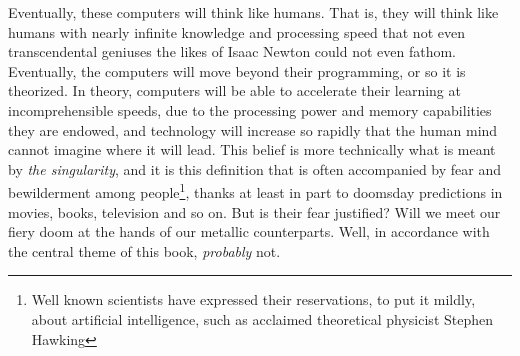\documentclass[../../fulltext/fulltext.tex]{subfiles}
\begin{document}
Eventually, these computers will think like humans. That is, they will think like humans with nearly infinite knowledge and processing speed that not even transcendental geniuses the likes of Isaac Newton could not even fathom. Eventually, the computers will move beyond their programming, or so it is theorized. In theory, computers will be able to accelerate their learning at incomprehensible speeds, due to the processing power and memory capabilities they are endowed, and technology will increase so rapidly that the human mind cannot imagine where it will lead.  This belief is more technically what is meant by \emph{the singularity}, and it is this definition that is often accompanied by fear and bewilderment among people\footnote{Well known scientists have expressed their reservations, to put it mildly, about artificial intelligence, such as acclaimed theoretical physicist Stephen Hawking}, thanks at least in part to doomsday predictions in movies, books, television and so on. But is their fear justified?  Will we meet our fiery doom at the hands of our metallic counterparts.  Well, in accordance with the central theme of this book, \emph{probably} not.  
\end{document}
